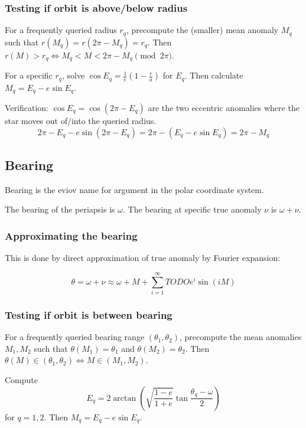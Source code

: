 \documentclass{article}
\def\p#1{ \left( #1 \right)}
\begin{document}
\subsubsection{Testing if orbit is above/below radius}
For a frequently queried radius $r_q$,
precompute the (smaller) mean anomaly $M_q$ such that
$ r(M_q) = r(2\pi - M_q) = r_q$.
Then $r(M) > r_q \iff M_q < M < 2\pi - M_q \pmod{2\pi}$.

For a specific $r_q$,
solve $\cos E_q = \frac1e \p{1 - \frac ra}$ for $E_q$.
Then calculate $M_q = E_q - e \sin E_q$.

Verification: $\cos E_q = \cos(2 \pi - E_q)$ are the two eccentric anomalies
where the star moves out of/into the queried radius.
$$ 2\pi - E_q - e \sin(2\pi - E_q) = 2\pi - \p{E_q - e \sin E_q} = 2\pi - M_q $$

\subsection{Bearing}
Bearing is the eviov name for argument in the polar coordinate system.

The bearing of the periapsis is $\omega$.
The bearing at specific true anomaly $\nu$ is $\omega + \nu$.

\subsubsection{Approximating the bearing}
This is done by direct approximation of true anomaly by Fourier expansion:

$$ \theta = \omega + \nu \approx \omega + M + \sum_{i=1}^\infty TODO e^i \sin(iM) $$

\subsubsection{Testing if orbit is between bearing}
For a frequently queried bearing range $\p{\theta_1, \theta_2}$,
precompute the mean anomalies $M_1, M_2$ such that
$\theta(M_1) = \theta_1$ and $\theta(M_2) = \theta_2$.
Then $\theta(M) \in \p{\theta_1, \theta_2} \iff M \in \p{M_1, M_2}$.

Compute $$ E_q = 2 \arctan\p{ \sqrt{\frac{1-e}{1+e}} \tan\frac{\theta_q - \omega}2 } $$
for $q = 1,2$.
Then $M_q = E_q - e \sin E_q$.
\end{document}
